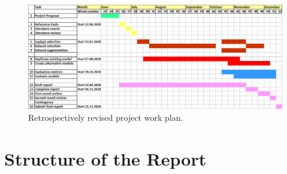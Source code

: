 \begin{figure}[ht]
 \centering 
 \includegraphics[width=\textwidth]{Figures/Revised-work-breakdown-structure.png}
 \caption{Retrospectively revised project work plan.}
 \label{fig:Revised-work-breakdown-structure} 
\end{figure}


\section{Structure of the Report}

